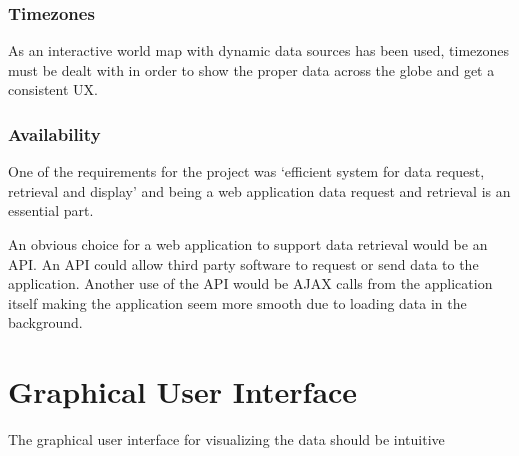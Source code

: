 \subsubsection{Timezones}
\label{sec:timezones}
As an interactive world map with dynamic data sources has been used, timezones must be dealt with in order to show the proper data across the globe and get a consistent UX.

\subsubsection{Availability}
\label{sec:availability}
One of the requirements for the project was `efficient system for data request, retrieval and display' and being a web application data request and retrieval is an essential part.

An obvious choice for a web application to support data retrieval would be an API. An API could allow third party software to request or send data to the application. Another use of the API would be AJAX calls from the application itself making the application seem more smooth due to loading data in the background.

\section{Graphical User Interface}
\label{sec:graphical_user_interface}
The graphical user interface for visualizing the data should be intuitive
